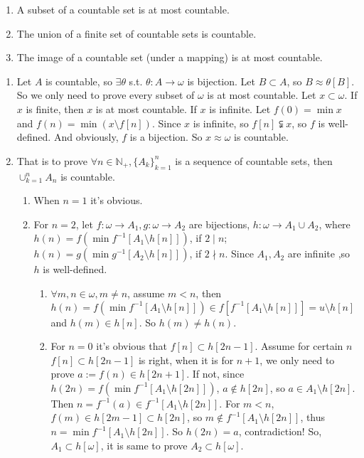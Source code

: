 \documentclass{ctexart}
\begin{document}
\begin{problem}
\begin{enumerate}
\item A subset of a countable set is at most countable.
\item The union of a finite set of countable sets is countable.
\item The image of a countable set (under a mapping) is at most countable.
\end{enumerate}
\end{problem}

\begin{solution}
    \begin{enumerate}
     \item Let $A$ is countable, so $\exists \theta$ s.t. $\theta:A\to \omega$ is bijection. Let $B\subset A$, so $B\approx \theta[B]$. So we only need to prove every subset of $\omega$ is at most countable. Let $x\subset \omega$. If $x$ is finite, then $x$ is at most countable. If $x$ is infinite. Let $f(0)=\min x$ and $f(n)=\min (x\setminus f[n])$. Since $x$ is infinite, so $f[n]\subsetneqq x$, so $f$ is well-defined. And obviously, $f$ is a bijection. So $x\approx \omega$ is countable. 
     \item That is to prove $\forall n\in \mathbb{N}_+, \{A_k\}_{k=1}^{n}$ is a sequence of countable sets, then $\cup_{k=1}^nA_n$ is countable. 
     \begin{enumerate}
        \item When $n=1$ it's obvious.
        \item For $n=2$, let $f:\omega\to A_1,g:\omega\to A_2$ are bijections, $h:\omega\to A_1\cup A_2$, where $h(n)=f(\min f^{-1}[A_1\setminus h[n]])$, if $2\mid n$; $h(n)=g(\min g^{-1}[A_2\setminus h[n]])$, if $2\nmid n$. Since $A_1,A_2$ are infinite ,so $h$ is well-defined. 
        \begin{enumerate}
            \item $\forall m,n\in \omega,m\neq n$, assume $m<n$, then $h(n)=f(\min f^{-1}[A_1\setminus h[n]])\in f[f^{-1}[A_1\setminus h[n]]]=u\setminus h[n]$ and $h(m)\in h[n]$. So $h(m)\neq h(n)$. 
            \item For $n=0$ it's obvious that $f[n]\subset h[2n-1]$. Assume for certain $n$ $f[n]\subset h[2n-1]$ is right, when it is for $n+1$, we only need to prove $a:=f(n)\in h[2n+1]$. If not, since $h(2n)=f(\min f^{-1}[A_1\setminus h[2n]])$,  $a\notin h[2n]$, so $a\in A_1\setminus h[2n]$. Then $n=f^{-1}(a)\in f^{-1}[A_1\setminus h[2n]]$. For $m<n$, $f(m)\in h[2m-1]\subset h[2n]$, so $m\notin f^{-1}[A_1\setminus h[2n]]$, thus $n=\min f^{-1}[A_1\setminus h[2n]]$. So $h(2n)=a$, contradiction! So, $A_1\subset h[\omega]$, it is same to prove $A_2\subset h[\omega]$.
            

\end{enumerate}
\end{enumerate}
\end{enumerate}
\end{solution}
\end{document}
